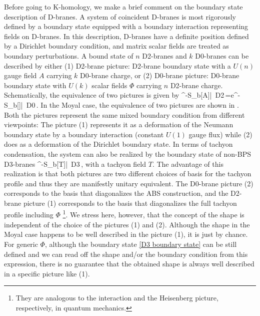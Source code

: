 \documentclass[12pt]{article}
\numberwithin{equation}{section}
\newcommand{\Ket}[1]{\left|\, #1\,\right\rangle}
\def\bea#1\ena{\begin{align}#1\end{align}}
\begin{document}
Before going to K-homology, 
we make a brief comment on the 
{boundary state description of D-branes.}
A system of coincident D-branes is most rigorously defined 
by a boundary state equipped with a boundary interaction representing fields on D-branes.
In this description, D-branes have a definite position defined by a Dirichlet boundary condition,
and matrix scalar fields are treated as boundary perturbations.
A bound state of $n$ D2-branes and $k$ D0-branes can be described by either 
(1) D2-brane picture: 
D2-brane boundary state with a $U(n)$ gauge field $A$ carrying $k$ D0-brane charge, or 
(2) D0-brane picture: 
D0-brane boundary state with $U(k)$ scalar fields $\Phi$ carrying $n$ D2-brane charge.
Schematically, the equivalence of two pictures is given by
\bea
e^{-S_b[A]}\Ket{D2}=e^{-S_b[\Phi]}\Ket{D0}.
\ena
In the Moyal case, the equivalence of two pictures are shown in {\cite{Ishibashi1999}}.
Both the pictures represent the same mixed boundary condition from different viewpoints:
The picture (1) represents it as a deformation of the Neumann boundary state by 
a boundary interaction (constant $U(1)$ gauge flux)
{while} (2) does as a deformation of the Dirichlet boundary state.
{In terms of tachyon condensation, the system can also be realized
by the boundary state of non-BPS D3-branes
\bea
e^{-S_b[T]}\Ket{D3},
\label{D3 boundary state}
\ena
with a tachyon field $T$.} 
The advantage of this realization
is that both pictures are two different choices of basis for the tachyon profile and thus they are manifestly unitary equivalent.
The D0-brane picture (2) corresponds to the basis that diagonalizes the ABS construction,
and the D2-brane picture (1) corresponds to the basis that diagonalizes the full tachyon profile including $\Phi$%
\footnote{
They are analogous to the interaction and the Heisenberg picture, respectively,  
in quantum mechanics.
}.
We stress here, however, that the concept of the shape is independent of the choice of the pictures (1) and (2). Although the shape in the Moyal case happens to be well described in the picture (1), it is just by chance. For generic $\Phi$, although the boundary state \eqref{D3 boundary state} can be still defined and we can read off the shape and/or the boundary condition from this expression, there is no guarantee that the obtained shape is always well described in a specific picture like (1). 
\end{document}
